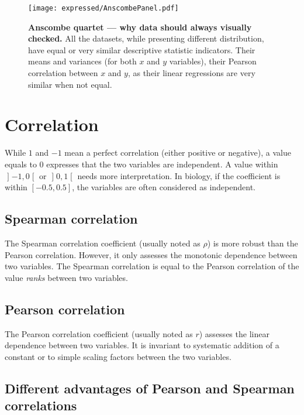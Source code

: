 \begin{figure}
    \texttt{[image: expressed/AnscombePanel.pdf]}\centering
    \caption[Anscombe quartet --- why data should always visualy checked]
    {\label{fig:Anscombe}\textbf{Anscombe quartet --- why data should always
    visually checked.}\smallbreak{} All the datasets, while presenting
    different distribution, have equal or very similar descriptive statistic
    indicators. Their means and variances (for both $x$ and $y$ variables),
    their Pearson correlation between $x$ and $y$,
    as their linear regressions are very similar when not equal.}
\end{figure}


\section{Correlation}\label{sec:CorrMore}

While $1$ and $-1$ mean a perfect correlation (either positive or negative),
a value equals to $0$ expresses that the two variables are independent.
A value within $\mathopen]-1,0\mathclose[$
or $\mathopen]0,1\mathclose[$ needs more interpretation. In biology, if the
coefficient is within $[-0.5,0.5]$, the variables are often considered as
independent.

\subsection{Spearman correlation}\label{subsec:SpearmanCor}
The Spearman correlation coefficient (usually noted as $\rho$)
is more robust than the Pearson correlation.
However, it only assesses the monotonic dependence between two variables.
The Spearman correlation is equal to the Pearson correlation of the value
\emph{ranks} between two variables.

\subsection{Pearson correlation}\label{subsec:PearsonCor}
The Pearson correlation coefficient (usually noted as $r$) assesses the linear
dependence between two variables. It is invariant to systematic addition of a
constant or to simple scaling factors between the two variables.


\subsection{Different advantages of Pearson and Spearman correlations}\label{subsec:PearsonVsSpearman}

